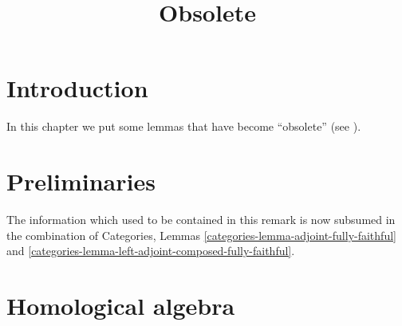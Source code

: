 

%


\title{Obsolete}

\maketitle

\label{section-phantom}

\tableofcontents




\section{Introduction}
\label{section-introduction}

\noindent
In this chapter we put some lemmas that have become ``obsolete''
(see \cite{Miller}).


\section{Preliminaries}
\label{section-preliminaries}

\begin{remark}
\label{remark-composition-of-adjoints-isomorphic-to-identity}
The information which used to be contained in this remark is now
subsumed in the combination of
Categories, Lemmas \ref{categories-lemma-adjoint-fully-faithful} and
\ref{categories-lemma-left-adjoint-composed-fully-faithful}.
\end{remark}


\section{Homological algebra}
\label{section-homological-algebra}

